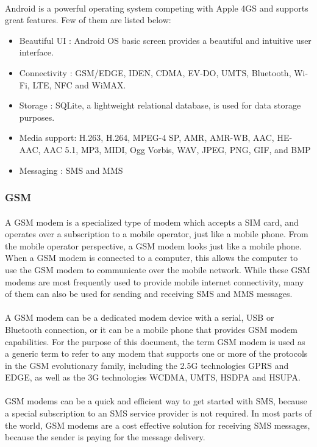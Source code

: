 \paragraph{}
Android is a powerful operating system competing with Apple 4GS and supports great features. Few of them are listed below:
\begin{itemize}
\item Beautiful UI : Android OS basic screen provides a beautiful and intuitive user interface.
\item Connectivity : GSM/EDGE, IDEN, CDMA, EV-DO, UMTS, Bluetooth, Wi-Fi, LTE, NFC and WiMAX.
\item Storage      : SQLite, a lightweight relational database, is used for data storage purposes.
\item Media support: H.263, H.264, MPEG-4 SP, AMR, AMR-WB, AAC, HE-AAC, AAC 5.1, MP3, MIDI, Ogg Vorbis, WAV, JPEG, PNG, GIF, and BMP
\item Messaging    : SMS and MMS 
\end{itemize}
\subsubsection{GSM}
\paragraph{}
A GSM modem is a specialized type of modem which accepts a SIM card, and operates over a subscription to a mobile operator, just like a mobile phone. From the mobile operator perspective, a GSM modem looks just like a mobile phone.
When a GSM modem is connected to a computer, this allows the computer to use the GSM modem to communicate over the mobile network.  While these GSM modems are most frequently used to provide mobile internet connectivity, many of them can also be used for sending and receiving SMS and MMS messages.
\paragraph{}
A GSM modem can be a dedicated modem device with a serial, USB or Bluetooth connection, or it can be a mobile phone that provides GSM modem capabilities.
For the purpose of this document, the term GSM modem is used as a generic term to refer to any modem that supports one or more of the protocols in the GSM evolutionary family, including the 2.5G technologies GPRS and EDGE, as well as the 3G technologies WCDMA, UMTS, HSDPA and HSUPA.
\paragraph{}
GSM modems can be a quick and efficient way to get started with SMS, because a special subscription to an SMS service provider is not required. In most parts of the world, GSM modems are a cost effective solution for receiving SMS messages, because the sender is paying for the message delivery.
